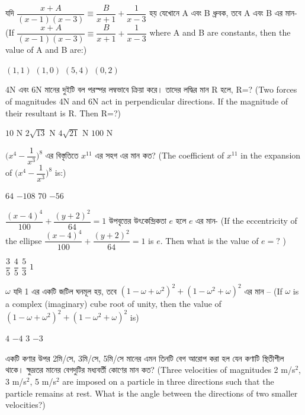 \documentclass[addpoints]{exam}
\begin{document}
\begin{questions}
 \question  যদি  $ \dfrac{x+A}{(x-1)(x-3)} \equiv \dfrac{B}{x+1} + \dfrac{1}{x-3} $ হয় যেখোনে A এবং B  ধ্রুবক, তবে A এবং B এর মান- (If $ \dfrac{x+A}{(x-1)(x-3)} \equiv \dfrac{B}{x+1} + \dfrac{1}{x-3} $ where A and B are constants, then the value of A and B are:)

\begin{oneparchoices}
\choice $ (1,1) $
\choice $ (1, 0) $
\choice $ (5,4) $
\choice  $ (0,2) $
\end{oneparchoices}

\question 4N এবং 6N মানের দুইটি বল পরস্পর লম্বভাবে ক্রিয়া করে। তাদের লদ্ধির মান R হলে, R=? (Two forces of magnitudes 4N and 6N act in perpendicular directions. If the magnitude of their resultant is R. Then R=?)

\begin{oneparchoices}
\choice $ 10 $ N
\choice  $ 2\sqrt{13} $ N
\choice $ 4\sqrt{21} $ N
\choice $ 100 $ N  
\end{oneparchoices}


\question $ \Big(x^{4}-\dfrac{1}{x^{3}}\Big)^{8} $ এর বিস্তৃতিতে $ x^{11} $ এর সহগ এর মান কত? (The coefficient of $ x^{11} $ in the expansion of $ \Big(x^{4}-\dfrac{1}{x^{3}}\Big)^{8} $ is:)

\begin{oneparchoices}
\choice $ 64 $
\choice $ -108 $
\choice $ 70 $
\choice $ -56 $
\end{oneparchoices}

\question  $ \dfrac{(x-4)^{4}}{100} + \dfrac{(y+2)^{2}}{64} =1 $ উপবৃত্তের উৎকেন্দ্রিকতা $ e $ হলে $ e $ এর মান- (If the eccentricity of the ellipse $ \dfrac{(x-4)^{4}}{100} + \dfrac{(y+2)^{2}}{64} =1 $ is $ e $. Then what is the value of $ e=? $ ) 

\begin{oneparchoices}
\choice $ \dfrac{3}{5} $
\choice $ \dfrac{4}{5} $
\choice $ \dfrac{5}{3} $
\choice $ 1 $
\end{oneparchoices}

\question $ \omega $ যদি 1 এর একটি জটিল ঘনমূল হয়, তবে $ (1-\omega +\omega^{2})^{2}+(1-\omega^{2}+\omega)^{2} $ এর মান – (If $ \omega $ is a complex (imaginary) cube root of unity, then the value of $ (1-\omega +\omega^{2})^{2}+(1-\omega^{2}+\omega)^{2} $ is)
 
\begin{oneparchoices}
\choice $ 4 $
\choice $ -4 $
\choice $ 3 $
\choice $ -3 $
\end{oneparchoices}

\question একটি কণার উপর 2মি/সে, 3মি/সে, 5মি/সে মানের এমন তিনটি বেগ আরোপ করা হল যেন কণাটি স্থিতীশীল থাকে। ক্ষুদ্রতর মানের বেগদুটির মধ্যবর্তী কোণের মান কত? (Three velocities of magnitudes 2 m/s$ ^{2} $, 3 m/s$ ^{2} $, 5 m/s$ ^{2} $ are imposed on a particle in three directions such that the particle remains at rest. What is the angle between the directions of two smaller velocities?)


\end{questions}
\end{document}
